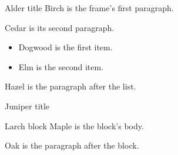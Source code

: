 \documentclass{beamer}
\begin{document}
\begin{frame}[t]{Alder title}
Birch is the frame's first paragraph.

Cedar is its second paragraph.
\begin{itemize}
\item Dogwood is the first item.
\item Elm is the second item.
\end{itemize}
Hazel is the paragraph after the list.
\end{frame}
\begin{frame}[t]{Juniper title}
\begin{block}{Larch block}
Maple is the block's body.
\end{block}
Oak is the paragraph after the block.
\end{frame}
\end{document}
